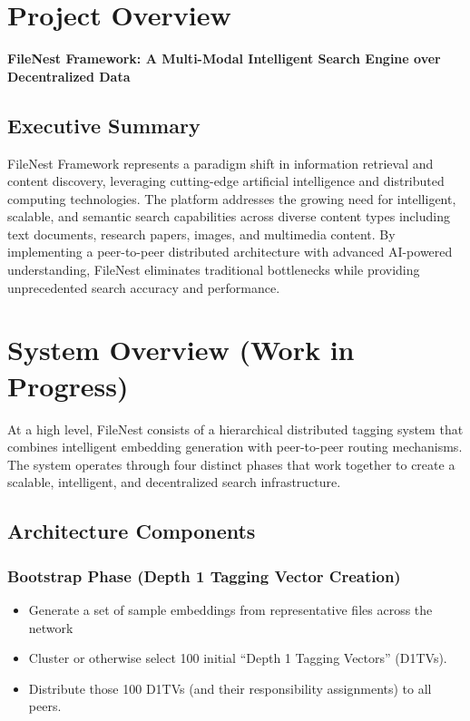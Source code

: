 \documentclass[11pt,a4paper]{article}
\begin{document}
\section{Project Overview}
\textbf{FileNest Framework: A Multi-Modal Intelligent Search Engine over Decentralized Data}

\subsection{Executive Summary}
FileNest Framework represents a paradigm shift in information retrieval and content discovery, leveraging cutting-edge artificial intelligence and distributed computing technologies. The platform addresses the growing need for intelligent, scalable, and semantic search capabilities across diverse content types including text documents, research papers, images, and multimedia content. By implementing a peer-to-peer distributed architecture with advanced AI-powered understanding, FileNest eliminates traditional bottlenecks while providing unprecedented search accuracy and performance.

\section{System Overview (Work in Progress)}

At a high level, FileNest consists of a hierarchical distributed tagging system that combines intelligent embedding generation with peer-to-peer routing mechanisms. The system operates through four distinct phases that work together to create a scalable, intelligent, and decentralized search infrastructure.

\subsection{Architecture Components}

\subsubsection{Bootstrap Phase (Depth 1 Tagging Vector Creation)}
\begin{itemize}
    \item Generate a set of sample embeddings from representative files across the network
    \item Cluster or otherwise select 100 initial “Depth 1 Tagging Vectors” (D1TVs).
    \item Distribute those 100 D1TVs (and their responsibility assignments) to all peers.
\end{itemize}
\end{document}
